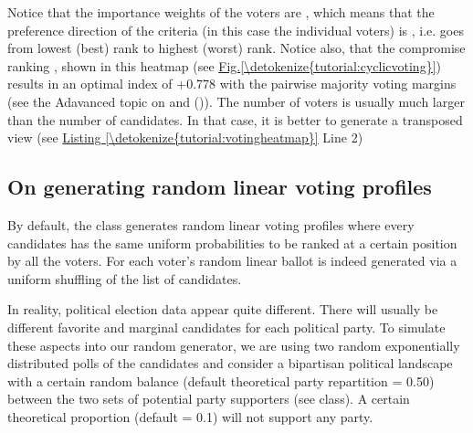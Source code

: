 \documentclass[a4paper,12pt,english]{sphinxhowto}
\begin{document}
Notice that the importance weights of the voters are , which means that the preference direction of the criteria (in this case the individual voters) is , i.e. goes from lowest (best) rank to highest (worst) rank. Notice also, that the compromise  ranking \sphinxstyleemphasis{{[}a4,a5,a2,a1,a3{]}}, shown in this heatmap (see \hyperref[\detokenize{tutorial:cyclicvoting}]{Fig.\@ \ref{\detokenize{tutorial:cyclicvoting}}}) results in an optimal  index of +0.778 with the pairwise majority voting margins (see the Adavanced topic on   and {\hyperref[\detokenize{tutorial:ranking-tutorial-label}]{}} ()). The number of voters is usually much larger than the number of candidates. In that case, it is better to generate a transposed  view (see \hyperref[\detokenize{tutorial:votingheatmap}]{Listing \ref{\detokenize{tutorial:votingheatmap}}} Line 2)


\subsection{On generating random linear voting profiles}
\label{\detokenize{tutorial:on-generating-random-linear-voting-profiles}}
By default, the  class generates random linear voting profiles where every candidates has the same uniform probabilities to be ranked at a certain position by all the voters. For each voter’s random linear ballot is indeed generated  via a uniform shuffling of the list of candidates.

In reality, political election data appear quite different. There will usually be different favorite and marginal candidates for each political party. To simulate these aspects into our random generator, we are using two random exponentially distributed polls of the candidates and consider a bipartisan political landscape with a certain random balance (default theoretical party repartition = 0.50) between the two sets of potential party supporters (see  class). A certain theoretical proportion (default = 0.1) will not support any party.
\end{document}
